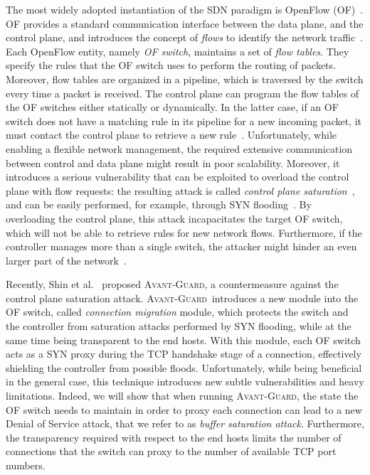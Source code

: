 \documentclass{sig-alternate}
\newcommand{\avantguard}{\textsc{Avant-Guard}}
\begin{document}
The most widely adopted instantiation of the SDN paradigm is OpenFlow (OF)~\cite{McKeown:2008:OEI:1355734.1355746,openflow_whitepaper}. 
OF provides a standard communication interface between the data plane, and the control plane, 
and introduces the concept of {\em flows} to identify the network traffic~\cite{openflow_whitepaper}. 
Each OpenFlow entity, namely {\em OF switch}, maintains a set of {\em flow tables}. They specify the rules that the 
OF switch uses to perform the routing of packets. 
Moreover, flow tables are organized in a pipeline, which is traversed by the switch every time a packet is received. 
The control plane can program the flow tables of the OF switches either statically or dynamically.
In the latter case, if an OF switch does not have a matching rule in its pipeline for a new incoming packet, 
it must contact the control plane to retrieve a new rule~\cite{openflow_switch_specs}. 
Unfortunately, while enabling a flexible network management, the required extensive communication between control and data plane might result in poor scalability. Moreover, it introduces a serious vulnerability that can be exploited to overload the control plane with flow requests: the resulting attack is called {\em control plane saturation}~\cite{AvantGuard,of-guard}, and can be easily performed, for example, through SYN flooding~\cite{Peng:2007:SND:1216370.1216373}.
By overloading the control plane, this attack incapacitates the target OF switch, which will not be able to retrieve rules for new network flows. Furthermore, if the controller manages more than a single switch, the attacker might hinder an even larger part of the network~\cite{AvantGuard,Kloti,of-guard,Benton:2013:OVA:2491185.2491222}.

Recently, Shin et al.~\cite{AvantGuard} proposed \avantguard, a countermeasure against the control plane saturation attack.
\avantguard~introduces a new module into the OF switch, called {\em connection migration} module, 
which protects the switch and the controller from saturation attacks performed by SYN flooding, while at the same time being transparent to the end hosts.
With this module, each OF switch acts as a SYN proxy during the TCP handshake stage of a connection, effectively shielding the controller from possible floods. 
Unfortunately, while being beneficial in the general case, this technique introduces new subtle vulnerabilities and heavy limitations. 
Indeed, we will show that when running \avantguard, the state the OF switch needs to maintain in order to proxy each connection can lead to a new Denial of Service attack, that we refer to as {\em buffer saturation attack}. Furthermore, the transparency required with respect to the end hosts limits the number of connections that the switch can proxy to the number of available TCP port numbers.
\end{document}
